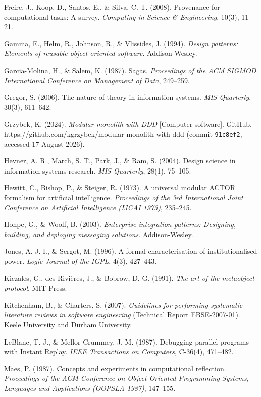 \documentclass[
]{article}
\begin{document}
Freire, J., Koop, D., Santos, E., \& Silva, C. T. (2008). Provenance for
computational tasks: A survey. \emph{Computing in Science \&
Engineering}, 10(3), 11--21.

Gamma, E., Helm, R., Johnson, R., \& Vlissides, J. (1994). \emph{Design
patterns: Elements of reusable object-oriented software}.
Addison-Wesley.

Garcia-Molina, H., \& Salem, K. (1987). Sagas. \emph{Proceedings of the
ACM SIGMOD International Conference on Management of Data}, 249--259.

Gregor, S. (2006). The nature of theory in information systems.
\emph{MIS Quarterly}, 30(3), 611--642.

Grzybek, K. (2024). \emph{Modular monolith with DDD} {[}Computer
software{]}. GitHub.
https://github.com/kgrzybek/modular-monolith-with-ddd (commit
\texttt{91c8ef2}, accessed 17 August 2026).

Hevner, A. R., March, S. T., Park, J., \& Ram, S. (2004). Design science
in information systems research. \emph{MIS Quarterly}, 28(1), 75--105.

Hewitt, C., Bishop, P., \& Steiger, R. (1973). A universal modular ACTOR
formalism for artificial intelligence. \emph{Proceedings of the 3rd
International Joint Conference on Artificial Intelligence (IJCAI 1973)},
235--245.

Hohpe, G., \& Woolf, B. (2003). \emph{Enterprise integration patterns:
Designing, building, and deploying messaging solutions}. Addison-Wesley.

Jones, A. J. I., \& Sergot, M. (1996). A formal characterisation of
institutionalised power. \emph{Logic Journal of the IGPL}, 4(3),
427--443.

Kiczales, G., des Rivières, J., \& Bobrow, D. G. (1991). \emph{The art
of the metaobject protocol}. MIT Press.

Kitchenham, B., \& Charters, S. (2007). \emph{Guidelines for performing
systematic literature reviews in software engineering} (Technical Report
EBSE-2007-01). Keele University and Durham University.

LeBlanc, T. J., \& Mellor-Crummey, J. M. (1987). Debugging parallel
programs with Instant Replay. \emph{IEEE Transactions on Computers},
C-36(4), 471--482.

Maes, P. (1987). Concepts and experiments in computational reflection.
\emph{Proceedings of the ACM Conference on Object-Oriented Programming
Systems, Languages and Applications (OOPSLA 1987)}, 147--155.
\end{document}
